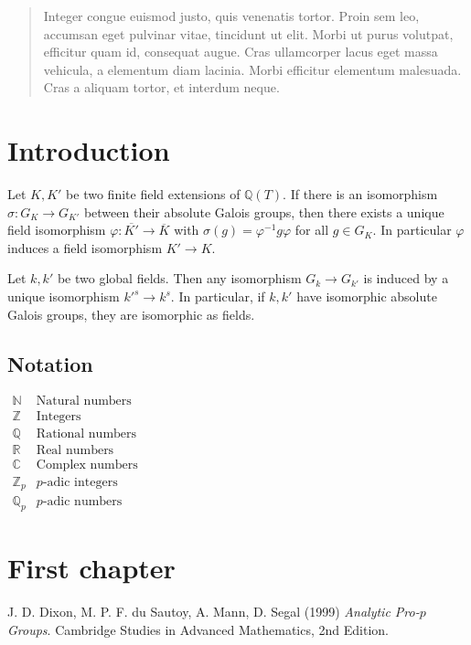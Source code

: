 \documentclass[11pt,a4paper,openany]{memoir}
\begin{document}
\vspace{1cm}

\renewcommand{\abstractname}{Zusammenfassung}
\begin{abstract}
Integer congue euismod justo, quis venenatis tortor. Proin sem leo, accumsan eget pulvinar vitae, tincidunt ut elit. Morbi ut purus volutpat, efficitur quam id, consequat augue. Cras ullamcorper lacus eget massa vehicula, a elementum diam lacinia. Morbi efficitur elementum malesuada. Cras a aliquam tortor, et interdum neque.
\end{abstract}
\vfill
\clearpage

\setcounter{page}{5}
\tableofcontents

\chapter{Introduction}

\begin{theorem}\label{thm:main-result}
Let $K,K'$ be two finite field extensions of $\mathbb{Q}(T)$. If there is an isomorphism $\sigma:G_K\to G_{K'}$ between their absolute Galois groups, then there exists a unique field isomorphism $\varphi:\overline{K'}\to\overline{K}$ with $\sigma(g)=\varphi^{-1}g\varphi$ for all $g\in G_K$. In particular $\varphi$ induces a field isomorphism $K'\to K$.
\end{theorem}

\begin{theorem}\label{thm:neukirch-uchida}
Let $k,k'$ be two global fields. Then any isomorphism $G_k\to G_{k'}$ is induced by a unique isomorphism $k'^s\to k^s$.  In particular, if $k,k'$ have isomorphic absolute Galois groups, they are isomorphic as fields.
\end{theorem}

\clearpage

\section{Notation}

$\begin{array}{ll}
\mathbb{N} & \text{Natural numbers} \\
\mathbb{Z} & \text{Integers}\\
\mathbb{Q} & \text{Rational numbers}\\
\mathbb{R} & \text{Real numbers}\\
\mathbb{C} & \text{Complex numbers}\\
\mathbb{Z}_p & \text{$p$-adic integers}\\
\mathbb{Q}_p & \text{$p$-adic numbers}
\end{array}$

\chapter{First chapter}

\begin{thebibliography}{99999999}

	J. D. Dixon, M. P. F. du Sautoy, A. Mann, D. Segal (1999)
	\textit{Analytic Pro-$p$ Groups}.
	Cambridge Studies in Advanced Mathematics,
	2nd Edition.

\end{thebibliography}

\end{document}
